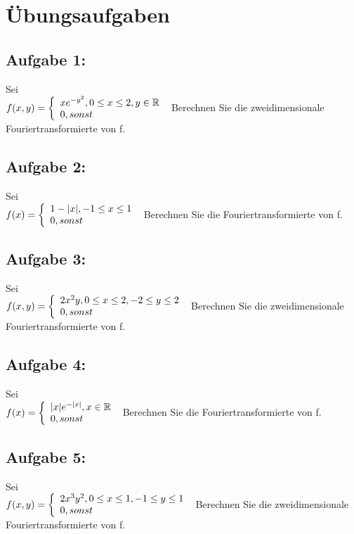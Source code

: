 \documentclass[11pt,final]{scrreprt}
\newcommand{\br} {\medskip\\}
\newcommand{\R} {\mathbb R}
\begin{document}
\newpage
\section{Übungsaufgaben}
\subsection*{Aufgabe 1:}
Sei\\
$
f(x,y) = \left\{
\begin{array}{l}
xe^{-y^2}, 0\leq x\leq 2,  y\in \R \\ 
0, sonst
\end{array}
\right.\\
$
Berechnen Sie die zweidimensionale Fouriertransformierte von f.\br

\subsection*{Aufgabe 2:}
Sei\\
$
f(x) = \left\{
\begin{array}{l}
{1-|x|}, -1\leq x\leq 1\\ 
0, sonst
\end{array}
\right.\\
$
Berechnen Sie die Fouriertransformierte von f.\br

\subsection*{Aufgabe 3:}
Sei\\
$
f(x,y) = \left\{
\begin{array}{l}
2 x^2 y, 0\leq x\leq 2,  -2\leq y\leq 2 \\ 
0, sonst
\end{array}
\right.\\
$
Berechnen Sie die zweidimensionale Fouriertransformierte von f.\br

\subsection*{Aufgabe 4:}
Sei\\
$
f(x) = \left\{
\begin{array}{l}
|x|e^{-|x|}, x \in \R\\ 
0, sonst
\end{array}
\right.\\
$
Berechnen Sie die Fouriertransformierte von f.\br

\subsection*{Aufgabe 5:}
Sei\\
$
f(x,y) = \left\{
\begin{array}{l}
2 x^3 y^2, 0\leq x\leq 1,  -1\leq y\leq 1 \\ 
0, sonst
\end{array}
\right.\\
$
Berechnen Sie die zweidimensionale Fouriertransformierte von f.\br
\end{document}
